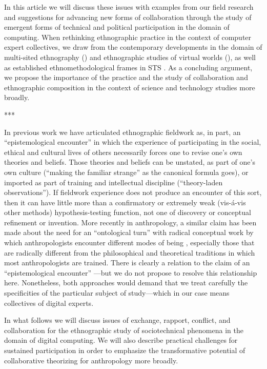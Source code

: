 \documentclass[10pt,letter,oneside]{scrartcl}
\begin{document}
In this article we will discuss these issues with examples from our
field research and suggestions for advancing new forms of
collaboration through the study of emergent forms of technical and
political participation in the domain of computing.  When rethinking
ethnographic practice in the context of computer expert collectives,
we draw from the contemporary developments in the domain of
multi-sited ethnography
(\cite{Fischer1999,Marcus1995,Burrell2009,Falzonetal2009,Rabinow2008})
and ethnographic studies of virtual worlds
(\cite{BOELLSTORFF2008,Miller2001,Horst2012,boellstorff2012ethnography}),
as well as established ethnomethodological frames in STS
\cite{Forsythe1999,forsythe2001studying,Latour2007,Suchman1987,Suchman1999}.  As a concluding argument, we
propose the importance of the practice and the study of collaboration
and ethnographic composition \cite{Kelty2008a} in the context of
science and technology studies more broadly.

***

In previous work we have articulated ethnographic fieldwork as, in
part, an ``epistemological encounter'' \cite{Kelty2008} in which the
experience of participating in the social, ethical and cultural lives
of others necessarily forces one to revise one's own theories and
beliefs.  Those theories and beliefs can be unstated, as part of one's
own culture (``making the familiar strange'' as the canonical formula
goes), or imported as part of training and intellectual discipline
(``theory-laden observations'').  If fieldwork experience does not
produce an encounter of this sort, then it can have little more than a
confirmatory or extremely weak (vis-á-vis other methods)
hypothesis-testing function, not one of discovery or conceptual
refinement or invention.  More recently in anthropology, a similar
claim has been made about the need for an ``ontological turn'' with
radical conceptual work by which anthropologists encounter different
modes of being \cite{ViveirosdeCastro2014,Latour2013,Kohn2013,Henare2007}, especially those that
are radically different from the philosophical and theoretical
traditions in which most anthropologists are trained.  There is
clearly a relation to the claim of an ``epistemological encounter''
---but we do not propose to resolve this relationship here.
Nonetheless, both approaches would demand that we treat carefully the
specificities of the particular subject of study---which in our case
means collectives of digital experts.

In what follows we will discuss issues of exchange, rapport, conflict,
and collaboration for the ethnographic study of sociotechnical
phenomena in the domain of digital computing. We will also describe
practical challenges for sustained participation in order to emphasize
the transformative potential of collaborative theorizing for
anthropology more broadly.
\end{document}

